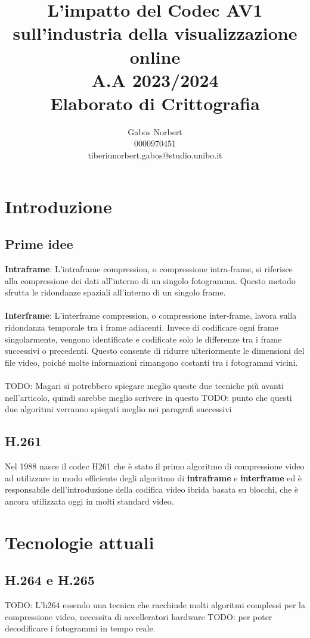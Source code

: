 \documentclass[a4paper,12pt, oneside]{article}
\title{\textbf{L'impatto del Codec AV1 sull'industria della visualizzazione online} \\ \large A.A 2023/2024 \\ Elaborato di Crittografia}
\author{Gabos Norbert \\ 0000970451 \\ tiberiunorbert.gabos@studio.unibo.it }
\date{}
\begin{document}
\maketitle

\newpage
\tableofcontents{}
\newpage

\section{Introduzione}

\subsection{Prime idee}
\textbf{Intraframe}: L'intraframe compression, o compressione intra-frame, si riferisce alla
compressione dei dati all'interno di un singolo fotogramma. Questo metodo sfrutta le ridondanze
spaziali all'interno di un singolo frame.
\\\\\textbf{Interframe}: L'interframe compression, o compressione inter-frame, lavora sulla
ridondanza temporale tra i frame adiacenti. Invece di codificare ogni frame singolarmente,
vengono identificate e codificate solo le differenze tra i frame successivi o precedenti.
Questo consente di ridurre ulteriormente le dimensioni del file video, poiché molte
informazioni rimangono costanti tra i fotogrammi vicini.
\\\\
TODO: Magari si potrebbero spiegare meglio queste due tecniche più avanti nell'articolo, quindi sarebbe meglio scrivere in questo
TODO: punto che questi due algoritmi verranno spiegati meglio nei paragrafi successivi

\subsection{H.261}
Nel 1988 nasce il codec H261 che è stato il primo algoritmo di compressione video ad utilizzare
in modo efficiente degli algoritmo di \textbf{intraframe} e \textbf{interframe} ed è
responsabile dell'introduzione della codifica video ibrida basata su blocchi, che è ancora
utilizzata oggi in molti standard video.

\section{Tecnologie attuali}
\subsection{H.264 e H.265}
TODO: L'h264 essendo una tecnica che racchiude molti algoritmi complessi per la compressione video, necessita di accelleratori hardware
TODO: per poter decodificare i fotogrammi in tempo reale.
\end{document}
